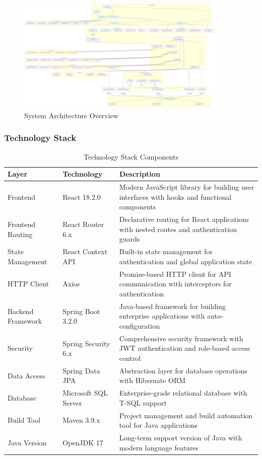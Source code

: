 \documentclass[12pt,a4paper]{article}
\begin{document}
\begin{figure}[H]
\centering
\includegraphics[width=0.9\textwidth]{diagrams/system_architecture.png}
\caption{System Architecture Overview}
\label{fig:system-architecture}
\end{figure}

\subsubsection{Technology Stack}

\begin{table}[H]
\centering
\caption{Technology Stack Components}
\label{tab:tech-stack}
\begin{tabularx}{\textwidth}{|l|l|X|}
\hline
\textbf{Layer} & \textbf{Technology} & \textbf{Description} \\
\hline
Frontend & React 18.2.0 & Modern JavaScript library for building user interfaces with hooks and functional components \\
\hline
Frontend Routing & React Router 6.x & Declarative routing for React applications with nested routes and authentication guards \\
\hline
State Management & React Context API & Built-in state management for authentication and global application state \\
\hline
HTTP Client & Axios & Promise-based HTTP client for API communication with interceptors for authentication \\
\hline
Backend Framework & Spring Boot 3.2.0 & Java-based framework for building enterprise applications with auto-configuration \\
\hline
Security & Spring Security 6.x & Comprehensive security framework with JWT authentication and role-based access control \\
\hline
Data Access & Spring Data JPA & Abstraction layer for database operations with Hibernate ORM \\
\hline
Database & Microsoft SQL Server & Enterprise-grade relational database with T-SQL support \\
\hline
Build Tool & Maven 3.9.x & Project management and build automation tool for Java applications \\
\hline
Java Version & OpenJDK 17 & Long-term support version of Java with modern language features \\
\hline
\end{tabularx}
\end{table}
\end{document}
